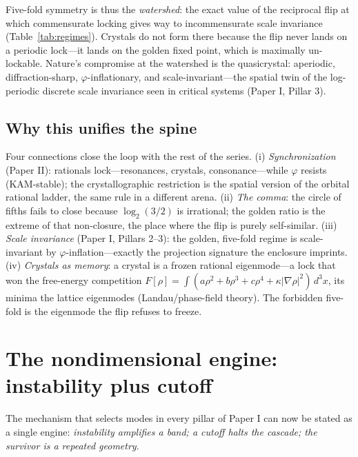 \documentclass[11pt]{article}
\theoremstyle{remark}
\begin{document}
Five-fold symmetry is thus the \emph{watershed}: the exact value of the reciprocal flip at which commensurate locking gives way to incommensurate scale invariance (Table~\ref{tab:regimes}). Crystals do not form there because the flip never lands on a periodic lock---it lands on the golden fixed point, which is maximally un-lockable. Nature's compromise at the watershed is the quasicrystal: aperiodic, diffraction-sharp, $\varphi$-inflationary, and scale-invariant---the spatial twin of the log-periodic discrete scale invariance seen in critical systems (Paper I, Pillar 3).

\subsection{Why this unifies the spine}

Four connections close the loop with the rest of the series. (i) \emph{Synchronization} (Paper II): rationals lock---resonances, crystals, consonance---while $\varphi$ resists (KAM-stable); the crystallographic restriction is the spatial version of the orbital rational ladder, the same rule in a different arena. (ii) \emph{The comma}: the circle of fifths fails to close because $\log_2(3/2)$ is irrational; the golden ratio is the extreme of that non-closure, the place where the flip is purely self-similar. (iii) \emph{Scale invariance} (Paper I, Pillars 2--3): the golden, five-fold regime is scale-invariant by $\varphi$-inflation---exactly the projection signature the enclosure imprints. (iv) \emph{Crystals as memory}: a crystal is a frozen rational eigenmode---a lock that won the free-energy competition $F[\rho] = \int (a\rho^2 + b\rho^3 + c\rho^4 + \kappa|\nabla\rho|^2)\, d^3x$, its minima the lattice eigenmodes (Landau/phase-field theory). The forbidden five-fold is the eigenmode the flip refuses to freeze.

\section{The nondimensional engine: instability plus cutoff}
\label{sec:engine}

The mechanism that selects modes in every pillar of Paper I can now be stated as a single engine: \emph{instability amplifies a band; a cutoff halts the cascade; the survivor is a repeated geometry}.
\end{document}
